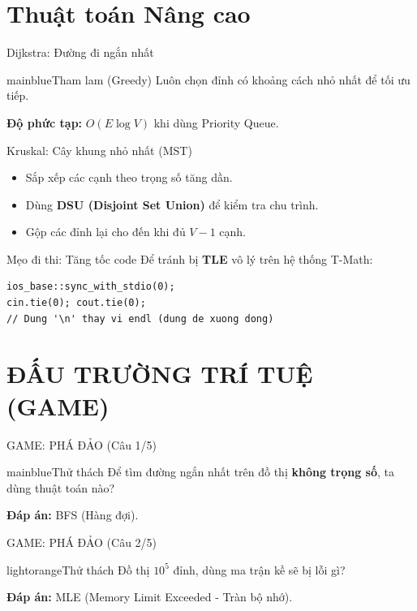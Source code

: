 \documentclass[10pt, xcolor={dvipsnames}]{beamer}
\begin{document}
\section{Thuật toán Nâng cao}
\begin{frame}{Dijkstra: Đường đi ngắn nhất}
    \begin{beautybox}{mainblue}{Tham lam (Greedy)}
        Luôn chọn đỉnh có khoảng cách nhỏ nhất để tối ưu tiếp.
    \end{beautybox}
    \textbf{Độ phức tạp:} $O(E \log V)$ khi dùng Priority Queue.
\end{frame}

\begin{frame}{Kruskal: Cây khung nhỏ nhất (MST)}
    \begin{itemize}
        \item Sắp xếp các cạnh theo trọng số tăng dần.
        \item Dùng \textbf{DSU (Disjoint Set Union)} để kiểm tra chu trình.
        \item Gộp các đỉnh lại cho đến khi đủ $V-1$ cạnh.
    \end{itemize}
\end{frame}

\begin{frame}[fragile]{Mẹo đi thi: Tăng tốc code}
    Để tránh bị \textbf{TLE} vô lý trên hệ thống T-Math:
\begin{lstlisting}
ios_base::sync_with_stdio(0);
cin.tie(0); cout.tie(0);
// Dung '\n' thay vi endl (dung de xuong dong)
\end{lstlisting}
\end{frame}

\section{ĐẤU TRƯỜNG TRÍ TUỆ (GAME)}
\begin{frame}{GAME: PHÁ ĐẢO (Câu 1/5)}
    \begin{beautybox}{mainblue}{Thử thách}
        Để tìm đường ngắn nhất trên đồ thị \textbf{không trọng số}, ta dùng thuật toán nào?
    \end{beautybox}
    \pause
    \begin{tcolorbox}[colback=green!10, colframe=green!50!black]
        \textbf{Đáp án:} BFS (Hàng đợi).
    \end{tcolorbox}
\end{frame}

\begin{frame}{GAME: PHÁ ĐẢO (Câu 2/5)}
    \begin{beautybox}{lightorange}{Thử thách}
        Đồ thị $10^5$ đỉnh, dùng ma trận kề sẽ bị lỗi gì?
    \end{beautybox}
    \pause
    \begin{tcolorbox}[colback=red!10, colframe=red!50!black]
        \textbf{Đáp án:} MLE (Memory Limit Exceeded - Tràn bộ nhớ).
    \end{tcolorbox}
\end{frame}
\end{document}
